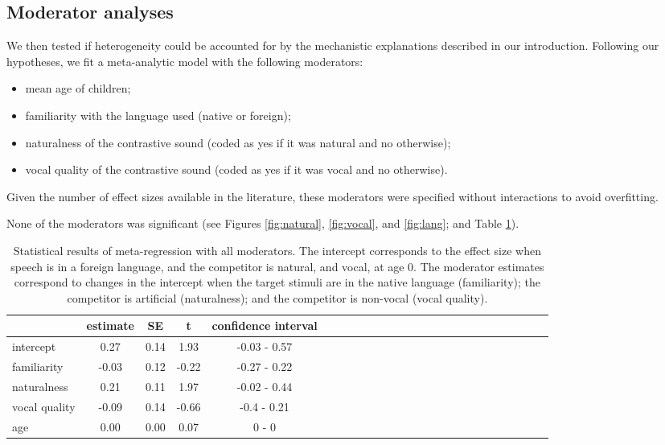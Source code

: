 \documentclass[man]{apa6}
\providecommand{\tightlist}{%
  \setlength{\itemsep}{0pt}\setlength{\parskip}{0pt}}
\begin{document}
\hypertarget{moderator-analyses}{%
\subsection{Moderator analyses}\label{moderator-analyses}}

We then tested if heterogeneity could be accounted for by the mechanistic explanations described in our introduction. Following our hypotheses, we fit a meta-analytic model with the following moderators:

\begin{itemize}
\tightlist
\item
  mean age of children;
\item
  familiarity with the language used (native or foreign);
\item
  naturalness of the contrastive sound (coded as yes if it was natural and no otherwise);
\item
  vocal quality of the contrastive sound (coded as yes if it was vocal and no otherwise).
\end{itemize}

Given the number of effect sizes available in the literature, these moderators were specified without interactions to avoid overfitting.

None of the moderators was significant (see Figures \ref{fig:natural}, \ref{fig:vocal}, and \ref{fig:lang}; and Table \ref{tab:Table2}).

\begin{table}[tbp]
\begin{center}
\begin{threeparttable}
\caption{\label{tab:Table2}Statistical results of meta-regression with all moderators. The intercept corresponds to the effect size when speech is in a foreign language, and the competitor is natural, and vocal, at age 0. The moderator estimates correspond to changes in the intercept when the target stimuli are in the native language (familiarity); the competitor is artificial (naturalness); and the competitor is non-vocal (vocal quality).}
\begin{tabular}{lcccclcccclcccclcccclcccc}
\toprule
 & estimate & SE & t & confidence interval\\
\midrule
intercept & 0.27 & 0.14 & 1.93 & -0.03 - 0.57\\
familiarity & -0.03 & 0.12 & -0.22 & -0.27 - 0.22\\
naturalness & 0.21 & 0.11 & 1.97 & -0.02 - 0.44\\
vocal quality & -0.09 & 0.14 & -0.66 & -0.4 - 0.21\\
age & 0.00 & 0.00 & 0.07 & 0 - 0\\
\bottomrule
\end{tabular}
\end{threeparttable}
\end{center}
\end{table}
\end{document}
